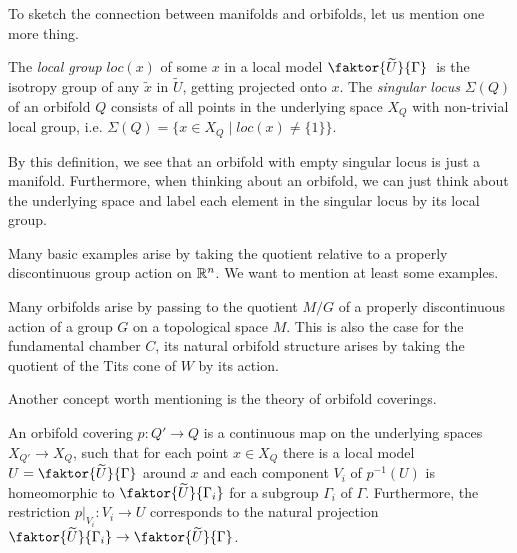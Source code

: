 To sketch the connection between manifolds and orbifolds, let us mention one more thing.

\begin{definition}
    The \emph{local group} \(loc(x)\) of some \(x\) in a local model \(\faktor{\widetilde{U}}{\Gamma}\;\) is the isotropy group of any \(\widetilde{x}\) in \(\widetilde{U}\), getting projected onto \(x\).
    The \emph{singular locus} \(\Sigma (Q)\) of an orbifold \(Q\) consists of all points in the underlying space \(X_Q\) with non-trivial local group, i.e. \(\Sigma(Q) = \{x \in X_Q \;\vert\; loc(x) \neq \{1\}\}\).
\end{definition}

By this definition, we see that an orbifold with empty singular locus is just a manifold.
Furthermore, when thinking about an orbifold, we can just think about the underlying space and label each element in the singular locus by its local group.

Many basic examples arise by taking the quotient relative to a properly discontinuous group action on \(\mathbb{R}^n\).
We want to mention at least some examples.

\begin{example}
\end{example}

Many orbifolds arise by passing to the quotient \(M/G\) of a properly discontinuous action of a group \(G\) on a topological space \(M\).
This is also the case for the fundamental chamber \(C\), its natural orbifold structure arises by taking the quotient of the Tits cone of \(W\) by its action. %

Another concept worth mentioning is the theory of orbifold coverings.

\begin{definition}
    An orbifold covering \(p: Q' \to Q\) is a continuous map on the underlying spaces \(X_{Q'} \to X_Q\), such that for each point \(x \in X_Q\) there is a local model \(U = \faktor{\widetilde{U}}{\Gamma}\) around \(x\) and each component \(V_i\) of \(p^{-1}(U)\) is homeomorphic to \(\faktor{\widetilde{U}}{\Gamma_i}\) for a subgroup \(\Gamma_i\) of \(\Gamma\).
    Furthermore, the restriction \(p\vert_{V_i} : V_i \to U\) corresponds to the natural projection \(\faktor{\widetilde{U}}{\Gamma_i} \to \faktor{\widetilde{U}}{\Gamma}\).
\end{definition}

